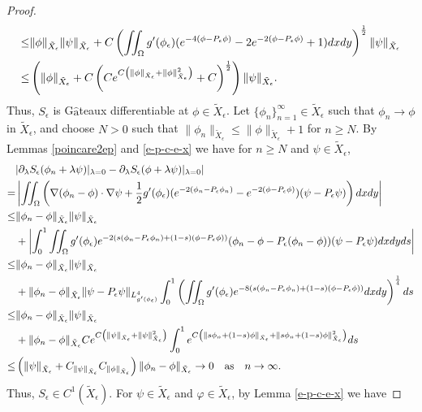 \documentclass[1 [leqno, 11pt]{amsart}
\numberwithin{equation}{section}
\let\ep=\epsilon
\begin{document}
\begin{CJK*}{GBK}{song}
\begin{proof}
\begin{align*}
\leq &\|\phi\|_{\tilde{X}_\ep}\|\psi\|_{\tilde{X}_\ep}+ C \left(\iint_\Omega    g'(\phi_\ep) (e^{-4(\phi-P_\ep\phi)}-2e^{-2(\phi-P_\ep\phi)}+1)dxdy\right)^{1\over2}\|\psi \|_{\tilde{X}_\ep}\\
\leq &\left(\|\phi\|_{\tilde{X}_\ep}+ C \left(C e^{C\left(\|\phi\|_{\tilde{X}_\ep}+\|\phi\|_{\tilde{X}_\ep}^2\right)}+C\right)^{1\over2}\right)\|\psi \|_{\tilde{X}_\ep}.
\end{align*}
Thus,  $S_\ep$  is G$\hat{\text{a}}$teaux differentiable at $\phi\in  \tilde{X}_\ep$.
Let $\{\phi_n\}_{n=1}^\infty\in \tilde X_\ep$ such that $\phi_n\to\phi$ in $\tilde{X}_\ep$,
and choose $N>0$ such that $\|\phi_n\|_{\tilde X_\ep}\leq \|\phi\|_{\tilde X_\ep}+1$ for $n\geq N$.   By Lemmas  \ref{poincare2ep} and \ref{e-p-c-e-x} we have for $n\geq N$ and $\psi\in\tilde X_\ep$,
\begin{align*}
&|\partial_\lambda S_\ep(\phi_n + \lambda \psi)|_{\lambda = 0}-\partial_\lambda S_\ep(\phi + \lambda \psi)|_{\lambda = 0}| \\
= & \left|\iint_{\Omega}\left(\nabla(\phi_n-\phi)\cdot\nabla\psi +{1\over 2} g'(\phi_\ep)(e^{-2(\phi_n-P_\ep\phi_n)} - e^{-2(\phi-P_\ep\phi)})(\psi-P_\ep\psi)\right) dxdy\right|\\
\leq&\|\phi_n-\phi\|_{\tilde X_\ep}\|\psi\|_{\tilde X_\ep}\\
&+\left|\int_0^1  \iint_{\Omega} g'(\phi_\ep) e^{-2(s(\phi_n-P_\ep\phi_n) + (1-s)(\phi-P_\ep\phi))}  (\phi_n - \phi-P_\ep(\phi_n-\phi))  (\psi-P_\ep\psi) dxdyds\right| \\
\leq&\|\phi_n-\phi\|_{\tilde X_\ep}\|\psi\|_{\tilde X_\ep}\\
&+\|\phi_n-\phi\|_{\tilde X_\ep}\|\psi-P_\ep\psi\|_{L^4_{g'(\phi_\ep)}}\int_0^1 \left( \iint_{\Omega} g'(\phi_\ep) e^{-8(s(\phi_n-P_\ep\phi_n) + (1-s)(\phi-P_\ep\phi))}  dxdy\right)^{1\over4}ds\\
\leq &  \|\phi_n-\phi\|_{\tilde X_\ep}\|\psi\|_{\tilde X_\ep}\\
&+\|\phi_n-\phi\|_{\tilde X_\ep}
 C e^{C\left(\|\psi\|_{\tilde{X}_\ep}+\|\psi\|_{\tilde{X}_\ep}^2\right)}
\int_0^1e^{C\left(\|s\phi_n + (1-s)\phi\|_{\tilde X_\ep}+\|s\phi_n + (1-s)\phi\|_{\tilde X_\ep}^2\right)}ds\\
\leq &\left(\|\psi\|_{\tilde X_\ep}+C_{\|\psi\|_{\tilde X_\ep}}C_{\|\phi\|_{\tilde X_\ep}}\right)\|\phi_n-\phi\|_{\tilde X_\ep}\to 0\quad \text{as}\quad n\to\infty.
\end{align*}
Thus, $S_\ep\in C^1(\tilde X_\ep)$.
 For
$\psi \in  \tilde{X}_\ep$ and $\varphi\in\tilde{X}_\ep$, by Lemma  \ref{e-p-c-e-x} we have

\end{proof}
\end{CJK*}
\end{document}
